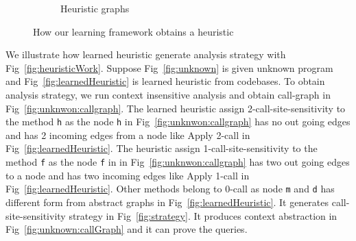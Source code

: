 \begin{figure}[t]
\begin{multicols}{3}
	\begin{subfigure}[b]{1.0\columnwidth}
		\begin{center}
		\end{center}
		\caption{Heuristic graphs}
	\end{subfigure}
	
	\end{multicols}
	\vspace{-1em}
	\caption{How our learning framework obtains a heuristic}
\end{figure}




We illustrate how learned heuristic generate analysis strategy with Fig~\ref{fig:heuristicWork}.
Suppose Fig~\ref{fig:unknown} is given unknown program and Fig~\ref{fig:learnedHeuristic} is learned heuristic from codebases.
To obtain analysis strategy, we run context insensitive analysis and obtain call-graph in Fig~\ref{fig:unknwon:callgraph}.
The learned heuristic assign 2-call-site-sensitivity to the method {\tt h} as
the node {\tt h} in Fig~\ref{fig:unknwon:callgraph} has no out going edges and has 2 incoming edges from a node like Apply 2-call in Fig~\ref{fig:learnedHeuristic}.
The heuristic assign 1-call-site-sensitivity to the method {\tt f} as
the node {\tt f} in in Fig~\ref{fig:unknwon:callgraph} has two out going edges to a node and has two incoming edges like Apply 1-call in Fig~\ref{fig:learnedHeuristic}.
Other methods belong to 0-call as node {\tt m} and {\tt d} has different form from abstract graphs in Fig~\ref{fig:learnedHeuristic}.
It generates call-site-sensitivity strategy in Fig~\ref{fig:strategy}. It produces context abstraction in Fig~\ref{fig:unknown:callGraph} and it can prove the queries.




